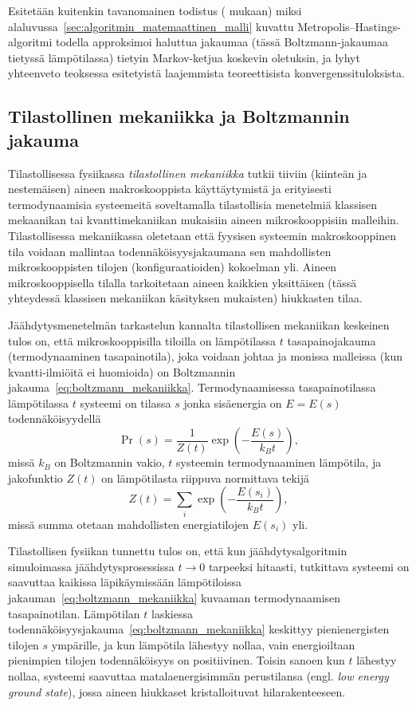 Esitetään kuitenkin tavanomainen todistus (\cite{chib95} mukaan) miksi alaluvussa~\ref{sec:algoritmin_matemaattinen_malli} kuvattu Metropolis--Hastings-algoritmi todella approksimoi haluttua jakaumaa (tässä Boltzmann-jakaumaa tietyssä lämpötilassa) tietyin Markov-ketjua koskevin oletuksin,
ja lyhyt yhteenveto teoksessa \cite{laarhoven} esitetyistä laajemmista teoreettisista konvergenssituloksista.

\subsection{Tilastollinen mekaniikka ja Boltzmannin jakauma}
\label{sub:tilastollinen_mekaniikka}

Tilastollisessa fysiikassa \emph{tilastollinen mekaniikka} tutkii tiiviin (kiinteän ja nestemäisen) aineen makroskooppista käyttäytymistä ja erityisesti termodynaamisia systeemeitä soveltamalla tilastollisia menetelmiä klassisen mekaanikan tai kvanttimekaniikan mukaisiin aineen mikroskooppisiin malleihin.
Tilastollisessa mekaniikassa oletetaan että fyysisen systeemin makroskooppinen tila voidaan mallintaa todennäköisyysjakaumana sen mahdollisten mikroskooppisten tilojen (konfiguraatioiden) kokoelman yli.
Aineen mikroskooppisella tilalla tarkoitetaan aineen kaikkien yksittäisen (tässä yhteydessä klassisen mekaniikan käsityksen mukaisten) hiukkasten tilaa.

Jäähdytysmenetelmän tarkastelun kannalta tilastollisen mekaniikan keskeinen tulos on,
että mikroskooppisilla tiloilla on lämpötilassa $t$ tasapainojakauma (termodynaaminen tasapainotila),
joka voidaan johtaa \cite[ks. esim.][luku 5]{salamonetal} ja monissa malleissa (kun kvantti-ilmiöitä ei huomioida) on Boltzmannin jakauma~\ref{eq:boltzmann_mekaniikka}.
Termodynaamisessa tasapainotilassa lämpötilassa $t$ systeemi on tilassa $s$ jonka sisäenergia on $E = E(s)$ todennäköisyydellä
\begin{equation}
    \label{eq:boltzmann_mekaniikka}
    \Pr\left(s\right) = \frac{1}{Z(t)} \exp \left(-\frac{E(s)}{k_B t}\right),
\end{equation}
missä $k_B$ on Boltzmannin vakio, $t$ systeemin termodynaaminen lämpötila,
ja jakofunktio $Z(t)$ on lämpötilasta riippuva normittava tekijä
\begin{equation}
    Z(t) = \sum_{i} \exp \left(-\frac{E(s_i)}{k_Bt}\right),
\end{equation}
missä summa otetaan mahdollisten energiatilojen $E(s_i)$ yli.

Tilastollisen fysiikan tunnettu tulos on, että kun jäähdytysalgoritmin simuloimassa jäähdytysprosessissa $t \to 0$ tarpeeksi hitaasti,
tutkittava systeemi on saavuttaa kaikissa läpikäymissään lämpötiloissa jakauman~\ref{eq:boltzmann_mekaniikka} kuvaaman termodynaamisen tasapainotilan.
Lämpötilan $t$ laskiessa todennäköisyysjakauma~\ref{eq:boltzmann_mekaniikka} keskittyy pienienergisten tilojen $s$ ympärille,
ja kun lämpötila lähestyy nollaa, vain energioiltaan pienimpien tilojen todennäköisyys on positiivinen.
Toisin sanoen kun $t$ lähestyy nollaa, systeemi saavuttaa matalaenergisimmän perustilansa (engl. \emph{low energy ground state}),
jossa aineen hiukkaset kristalloituvat hilarakenteeseen.

